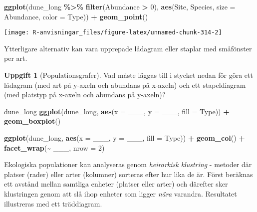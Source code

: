 \documentclass[
]{book}
\newenvironment{Shaded}{\begin{snugshade}}{\end{snugshade}}
\newcommand{\AttributeTok}[1]{\textcolor[rgb]{0.13,0.29,0.53}{#1}}
\newcommand{\DecValTok}[1]{\textcolor[rgb]{0.00,0.00,0.81}{#1}}
\newcommand{\FunctionTok}[1]{\textcolor[rgb]{0.13,0.29,0.53}{\textbf{#1}}}
\newcommand{\NormalTok}[1]{#1}
\newcommand{\SpecialCharTok}[1]{\textcolor[rgb]{0.81,0.36,0.00}{\textbf{#1}}}
\theoremstyle{definition}
\theoremstyle{definition}
\theoremstyle{definition}
\newtheorem{exercise}{Uppgift}[chapter]
\theoremstyle{definition}
\theoremstyle{remark}
\begin{document}
\begin{Shaded}
\begin{Highlighting}[]
\FunctionTok{ggplot}\NormalTok{(dune\_long }\SpecialCharTok{\%\textgreater{}\%} \FunctionTok{filter}\NormalTok{(Abundance }\SpecialCharTok{\textgreater{}} \DecValTok{0}\NormalTok{), }\FunctionTok{aes}\NormalTok{(Site, Species, }\AttributeTok{size =}\NormalTok{ Abundance, }\AttributeTok{color =}\NormalTok{ Type)) }\SpecialCharTok{+}
  \FunctionTok{geom\_point}\NormalTok{()}
\end{Highlighting}
\end{Shaded}

\begin{center}\texttt{[image: R-anvisningar\_files/figure-latex/unnamed-chunk-314-2]} \end{center}

Ytterligare alternativ kan vara upprepade lådagram eller staplar med småfönster per art.

\begin{exercise}[Populationsgrafer]

Vad måste läggas till i stycket nedan för göra ett lådagram (med art på y-axeln och abundans på x-axeln) och ett stapeldiagram (med platstyp på x-axeln och abundans på y-axeln)?

\begin{Shaded}
\begin{Highlighting}[]
\NormalTok{dune\_long}
\FunctionTok{ggplot}\NormalTok{(dune\_long, }\FunctionTok{aes}\NormalTok{(}\AttributeTok{x =}\NormalTok{ \_\_\_, }\AttributeTok{y =}\NormalTok{ \_\_\_, }\AttributeTok{fill =}\NormalTok{ Type)) }\SpecialCharTok{+}
  \FunctionTok{geom\_boxplot}\NormalTok{()}

\FunctionTok{ggplot}\NormalTok{(dune\_long, }\FunctionTok{aes}\NormalTok{(}\AttributeTok{x =}\NormalTok{ \_\_\_, }\AttributeTok{y =}\NormalTok{ \_\_\_, }\AttributeTok{fill =}\NormalTok{ Type)) }\SpecialCharTok{+}
  \FunctionTok{geom\_col}\NormalTok{() }\SpecialCharTok{+}
  \FunctionTok{facet\_wrap}\NormalTok{(}\SpecialCharTok{\textasciitilde{}}\NormalTok{ \_\_\_, }\AttributeTok{nrow =} \DecValTok{2}\NormalTok{)}
\end{Highlighting}
\end{Shaded}

\end{exercise}

Ekologiska populationer kan analyseras genom \emph{heirarkisk klustring} - metoder där platser (rader) eller arter (kolumner) sorteras efter hur lika de är. Först beräknas ett avstånd mellan samtliga enheter (platser eller arter) och därefter sker klustringen genom att slå ihop enheter som ligger \emph{nära} varandra. Resultatet illustreras med ett träddiagram.
\end{document}
